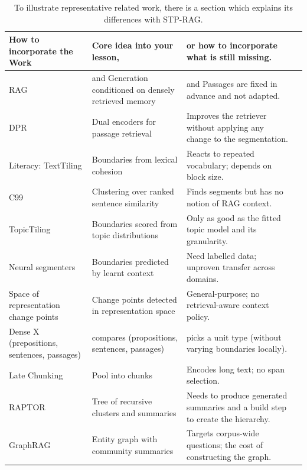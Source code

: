 \documentclass[10pt,a4paper]{article}
\begin{document}
\begin{table}[!htbp]
\caption{To illustrate representative related work, there is a section which explains its differences with STP-RAG.}
\label{tab:related}
\centering
\scriptsize
\setlength{\tabcolsep}{2.5pt}
\renewcommand{\arraystretch}{1.02}
\begin{tabularx}{\textwidth}{@{}>{\raggedright\arraybackslash}p{}>{\raggedright\arraybackslash}p{}>{\raggedright\arraybackslash}p{}>{\raggedright\arraybackslash}X@{}}
\toprule
How to incorporate the Work & Core idea into your lesson, & or how to incorporate what is still missing. & \\
\midrule
RAG \cite{lewis2020rag} & and Generation conditioned on densely retrieved memory & and Passages are fixed in advance and not adapted. & \\
DPR \cite{karpukhin2020dpr} & Dual encoders for passage retrieval & Improves the retriever without applying any change to the segmentation. & \\
Literacy: TextTiling \cite{hearst1997texttiling} & Boundaries from lexical cohesion & Reacts to repeated vocabulary; depends on block size. & \\
C99 \cite{choi2000c99} & Clustering over ranked sentence similarity & Finds segments but has no notion of RAG context. & \\
TopicTiling \cite{riedl2012topictiling} & Boundaries scored from topic distributions & Only as good as the fitted topic model and its granularity. & \\
Neural segmenters \cite{koshorek2018textseg,lo2021transformer2} & Boundaries predicted by learnt context & Need labelled data; unproven transfer across domains. & \\
Space of representation change points \cite{arlot2019kernelchangepoint} & Change points detected in representation space & General-purpose; no retrieval-aware context policy. & \\
Dense X \cite{chen2024densex} (prepositions, sentences, passages) & compares (propositions, sentences, passages) & picks a unit type (without varying boundaries locally). & \\
Late Chunking \cite{gunther2024latechunking} & Pool into chunks & Encodes long text; no span selection. & \\
RAPTOR \cite{sarthi2024raptor} & Tree of recursive clusters and summaries & Needs to produce generated summaries and a build step to create the hierarchy. & \\
GraphRAG \cite{edge2024graphrag} & Entity graph with community summaries & Targets corpus-wide questions; the cost of constructing the graph. & \\

\end{tabularx}
\end{table}
\end{document}
